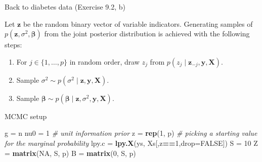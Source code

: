\documentclass[ignorenonframetext,]{beamer}
\newenvironment{Shaded}{\begin{snugshade}}{\end{snugshade}}
\newcommand{\KeywordTok}[1]{\textcolor[rgb]{0.13,0.29,0.53}{\textbf{#1}}}
\newcommand{\DataTypeTok}[1]{\textcolor[rgb]{0.13,0.29,0.53}{#1}}
\newcommand{\DecValTok}[1]{\textcolor[rgb]{0.00,0.00,0.81}{#1}}
\newcommand{\StringTok}[1]{\textcolor[rgb]{0.31,0.60,0.02}{#1}}
\newcommand{\CommentTok}[1]{\textcolor[rgb]{0.56,0.35,0.01}{\textit{#1}}}
\newcommand{\OtherTok}[1]{\textcolor[rgb]{0.56,0.35,0.01}{#1}}
\newcommand{\OperatorTok}[1]{\textcolor[rgb]{0.81,0.36,0.00}{\textbf{#1}}}
\newcommand{\NormalTok}[1]{#1}
\begin{document}
\begin{frame}{Back to diabetes data (Exercise 9.2, b)}

Let \(\boldsymbol{z}\) be the random binary vector of variable
indicators. Generating samples of
\(p(\boldsymbol{z},\sigma^{2},\boldsymbol{\beta})\) from the joint
posterior distribution is achieved with the following steps:

\begin{enumerate}
\def\labelenumi{\arabic{enumi}.}
\item
  For \(j\in\{1,\dots,p\}\) in random order, draw \(z_j\) from
  \(p(z_{j}\mid\boldsymbol{z}_{-j},\boldsymbol{y},\boldsymbol{X})\).
\item
  Sample
  \(\sigma^2 \sim p(\sigma^2 \mid \boldsymbol{z},\boldsymbol{y},\boldsymbol{X})\).
\item
  Sample
  \(\boldsymbol{\beta} \sim p(\boldsymbol{\beta} \mid \boldsymbol{z}, \sigma^2, \boldsymbol{y}, \boldsymbol{X})\).
\end{enumerate}

\end{frame}

\begin{frame}[fragile]{MCMC setup}

\begin{Shaded}
\begin{Highlighting}[]
\NormalTok{g =}\StringTok{ }\NormalTok{n}
\NormalTok{nu0 =}\StringTok{ }\DecValTok{1} \CommentTok{# unit information prior}
\NormalTok{z =}\StringTok{ }\KeywordTok{rep}\NormalTok{(}\DecValTok{1}\NormalTok{, p)}
\CommentTok{# picking a starting value for the marginal probability}
\NormalTok{lpy.c =}\StringTok{ }\KeywordTok{lpy.X}\NormalTok{(ys, Xs[,z}\OperatorTok{==}\DecValTok{1}\NormalTok{,}\DataTypeTok{drop=}\OtherTok{FALSE}\NormalTok{])}
\NormalTok{S =}\StringTok{ }\DecValTok{10}
\NormalTok{Z =}\StringTok{ }\KeywordTok{matrix}\NormalTok{(}\OtherTok{NA}\NormalTok{, S, p)}
\NormalTok{B =}\StringTok{ }\KeywordTok{matrix}\NormalTok{(}\DecValTok{0}\NormalTok{, S, p)}
\end{Highlighting}
\end{Shaded}

\end{frame}
\end{document}

